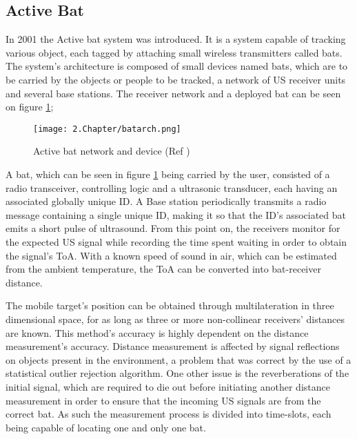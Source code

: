   
\subsection{Active Bat}  
\label{subsec:bat}  
  
  
In 2001 the Active bat system \cite{bat}was introduced. It is a system capable of tracking various object, each tagged by attaching small wireless transmitters called bats. The system's architecture is composed of small devices named bats, which are to be carried by the objects or people to be tracked, a network of \acf{US} receiver units and several base stations\cite{bat1}. The receiver network and a deployed bat can be seen on figure \ref{fig:bat};  
  
  
\begin{figure}[H]  
\centering  
\texttt{[image: 2.Chapter/batarch.png]}  
\caption[Active bat network and device(Ref \cite{batfig}) ]{Active bat network and device (Ref \cite{batfig}) }  
\label{fig:bat}  
\end{figure}  
  
  
A bat, which can be seen in figure \ref{fig:bat} being carried by the user, consisted of a radio transceiver, controlling logic and a ultrasonic transducer, each having an associated globally unique ID. A Base station periodically transmits a radio message containing a single unique ID, making it so that the ID's associated bat emits a short pulse of ultrasound. From this point on, the receivers monitor for the expected \ac{US} signal while recording the time spent waiting in order to obtain the signal's \ac{ToA}. With a known speed of sound in air, which can be estimated from the ambient temperature, the \ac{ToA} can be converted into bat-receiver distance.  
  
  
The mobile target's position can be obtained through multilateration in three dimensional space, for as long as three or more non-collinear receivers' distances are known. This method's accuracy is highly dependent on the distance measurement's accuracy. Distance measurement is affected by signal reflections on objects present in the environment, a problem that was correct by the use of a statistical outlier rejection algorithm. One other issue is the reverberations of the initial signal, which are required to die out before initiating another distance measurement in order to ensure that the incoming \ac{US} signals are from the correct bat. As such the measurement process is divided into time-slots, each being capable of locating one and only one bat.  
  
